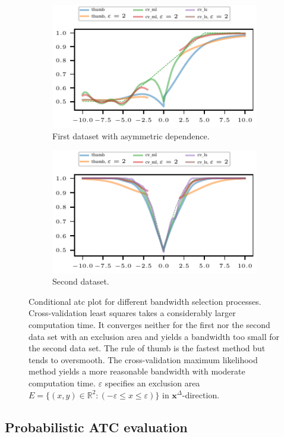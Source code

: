 \documentclass[pdflatex]{sn-jnl}
\theoremstyle{plain}%
\theoremstyle{definition}
\newcommand{\R}{\mathbb{R}}
\newcommand{\diffx}{\mathbf{x}^{\Delta}}
\begin{document}
\begin{figure}
    \centering
    \begin{subfigure}{.48\textwidth}
        \includegraphics{plots/illustrative_examples/cond_prob_plot_bw_butterfly}
        \caption{First dataset with asymmetric dependence.}
    \end{subfigure}
    \begin{subfigure}{.48\textwidth}
        \includegraphics{plots/illustrative_examples/cond_prob_plot_bw_normal}
        \caption{Second dataset. }
    \end{subfigure}
    \caption[Conditional ATC plots for different bandwidth selection processes.]{Conditional \ac{atc} plot for different bandwidth selection processes. Cross-validation least squares takes a considerably larger computation time. It converges neither for the first nor the second data set with an exclusion area and yields a bandwidth too small for the second data set. The rule of thumb is the fastest method but tends to oversmooth. The cross-validation maximum likelihood method yields a more reasonable bandwidth with moderate computation time. $\varepsilon$ specifies an exclusion area $E = \{(x, y) \in \R^2: (-\varepsilon \leq x \leq \varepsilon)\}$ in $\diffx$-direction.}\label{fig:atc-cond-prob-bw}
\end{figure}




\subsection{Probabilistic ATC evaluation}\label{subsec:app-probabilistic-atc-evaluation}
\end{document}
